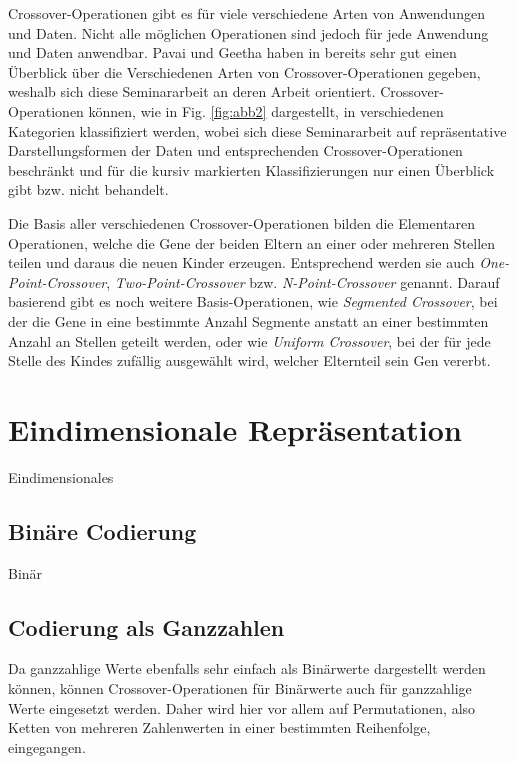 \documentclass{llncs}
\begin{document}
	Crossover-Operationen gibt es für viele verschiedene Arten von Anwendungen und Daten. Nicht alle möglichen Operationen sind jedoch für jede Anwendung und Daten anwendbar. Pavai und Geetha haben in \cite{Survey} bereits sehr gut einen Überblick über die Verschiedenen Arten von Crossover-Operationen gegeben, weshalb sich diese Seminararbeit an deren Arbeit orientiert. Crossover-Operationen können, wie in Fig. \ref{fig:abb2} dargestellt, in verschiedenen Kategorien klassifiziert werden, wobei sich diese Seminararbeit auf repräsentative Darstellungsformen der Daten und entsprechenden Crossover-Operationen beschränkt und für die kursiv markierten Klassifizierungen nur einen Überblick gibt bzw. nicht behandelt.
	
	Die Basis aller verschiedenen Crossover-Operationen bilden die Elementaren Operationen, welche die Gene der beiden Eltern an einer oder mehreren Stellen teilen und daraus die neuen Kinder erzeugen. Entsprechend werden sie auch \textit{One-Point-Crossover}, \textit{Two-Point-Crossover} bzw. \textit{N-Point-Crossover} genannt. Darauf basierend gibt es noch weitere Basis-Operationen, wie \textit{Segmented Crossover}, bei der die Gene in eine bestimmte Anzahl Segmente anstatt an einer bestimmten Anzahl an Stellen geteilt werden\cite{GABasicIdeas}, oder wie \textit{Uniform Crossover}, bei der für jede Stelle des Kindes zufällig ausgewählt wird, welcher Elternteil sein Gen vererbt. %

\section{Eindimensionale Repräsentation}
\label{sec:EindimensionaleRep}

Eindimensionales

\subsection{Binäre Codierung}
\label{sec:BinCod}

Binär

\subsection{Codierung als Ganzzahlen}
\label{sec:IntCod}

Da ganzzahlige Werte ebenfalls sehr einfach als Binärwerte dargestellt werden können, können Crossover-Operationen für Binärwerte auch für ganzzahlige Werte eingesetzt werden. Daher wird hier vor allem auf Permutationen, also Ketten von mehreren Zahlenwerten in einer bestimmten Reihenfolge, eingegangen.
\end{document}
